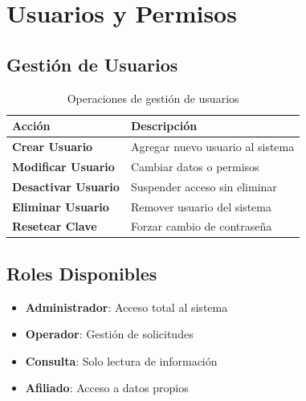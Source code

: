 \section{Usuarios y Permisos}

\subsection*{Gestión de Usuarios}

\begin{longtable}{p{3cm}p{9cm}}
\toprule
\textbf{Acción} & \textbf{Descripción} \\
\midrule
\endhead
\bottomrule
\caption{Operaciones de gestión de usuarios}
\label{tab:gestion-usuarios}
\endlastfoot

\textbf{Crear Usuario} & Agregar nuevo usuario al sistema \\
\textbf{Modificar Usuario} & Cambiar datos o permisos \\
\textbf{Desactivar Usuario} & Suspender acceso sin eliminar \\
\textbf{Eliminar Usuario} & Remover usuario del sistema \\
\textbf{Resetear Clave} & Forzar cambio de contraseña \\
\end{longtable}

\subsection*{Roles Disponibles}

\begin{itemize}[leftmargin=*]
    \item \textbf{Administrador}: Acceso total al sistema
    \item \textbf{Operador}: Gestión de solicitudes
    \item \textbf{Consulta}: Solo lectura de información
    \item \textbf{Afiliado}: Acceso a datos propios
\end{itemize}

\newpage
